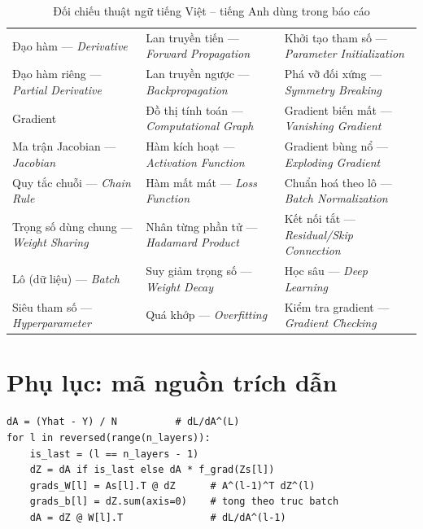 \documentclass[12pt,a4paper]{article}
\newcommand{\en}[1]{\textit{#1}}
\begin{document}
\begin{table}[htbp]
\centering
\small
\begin{tabular}{@{}p{4.6cm}p{4.6cm}p{4.6cm}@{}}
\toprule
Đạo hàm --- \en{Derivative} & Lan truyền tiến --- \en{Forward Propagation} & Khởi tạo tham số --- \en{Parameter Initialization} \\
Đạo hàm riêng --- \en{Partial Derivative} & Lan truyền ngược --- \en{Backpropagation} & Phá vỡ đối xứng --- \en{Symmetry Breaking} \\
Gradient & Đồ thị tính toán --- \en{Computational Graph} & Gradient biến mất --- \en{Vanishing Gradient} \\
Ma trận Jacobian --- \en{Jacobian} & Hàm kích hoạt --- \en{Activation Function} & Gradient bùng nổ --- \en{Exploding Gradient} \\
Quy tắc chuỗi --- \en{Chain Rule} & Hàm mất mát --- \en{Loss Function} & Chuẩn hoá theo lô --- \en{Batch Normalization} \\
Trọng số dùng chung --- \en{Weight Sharing} & Nhân từng phần tử --- \en{Hadamard Product} & Kết nối tắt --- \en{Residual/Skip Connection} \\
Lô (dữ liệu) --- \en{Batch} & Suy giảm trọng số --- \en{Weight Decay} & Học sâu --- \en{Deep Learning} \\
Siêu tham số --- \en{Hyperparameter} & Quá khớp --- \en{Overfitting} & Kiểm tra gradient --- \en{Gradient Checking} \\
\bottomrule
\end{tabular}
\caption{Đối chiếu thuật ngữ tiếng Việt -- tiếng Anh dùng trong báo cáo}
\label{tab:glossary}
\end{table}


\section*{Phụ lục: mã nguồn trích dẫn}
\begin{lstlisting}[caption={Backward pass thủ công (trích từ src/manual\_nn.py)}]
dA = (Yhat - Y) / N          # dL/dA^(L)
for l in reversed(range(n_layers)):
    is_last = (l == n_layers - 1)
    dZ = dA if is_last else dA * f_grad(Zs[l])
    grads_W[l] = As[l].T @ dZ      # A^(l-1)^T dZ^(l)
    grads_b[l] = dZ.sum(axis=0)    # tong theo truc batch
    dA = dZ @ W[l].T               # dL/dA^(l-1)
\end{lstlisting}
\end{document}
